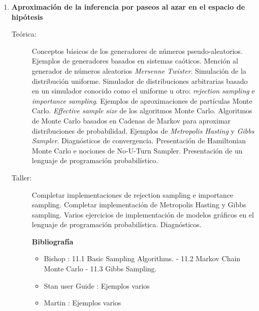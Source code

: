 \documentclass[10pt]{article}
\begin{document}
\begin{enumerate}
\item \textbf{Aproximación de la inferencia por paseos al azar en el espacio de hipótesis}
\vspace{-0.15cm}
\begin{description}
\item[Teórica:] Conceptos básicos de los generadores de números pseudo-aleatorios. Ejemplos de generadores basados en sistemas caóticos. Mención al generador de números aleatorios \emph{Mersenne Twister}. Simulación de la distribución uniforme. Simulador de distribuciones arbitrarias basado en un simulador conocido como el uniforme u otro: \emph{rejection sampling} e \emph{importance sampling}.
Ejemplos de aproximaciones de partículas Monte Carlo. \emph{Effective sample size} de los algoritmos Monte Carlo. Algoritmos de Monte Carlo basados en Cadenas de Markov para aproximar distribuciones de probabilidad. Ejemplos de \emph{Metropolis Hasting} y \emph{Gibbs Sampler}. Diagnósticos de convergencia.
Presentación de Hamiltonian Monte Carlo e nociones de No-U-Turn Sampler.
Presentación de un lenguaje de programación probabilístico.
\item[Taller:] Completar implementaciones de rejection sampling e importance sampling.
Completar implementación de Metropolis Hasting y Gibbs sampling.
Varios ejercicios de implementación de modelos gráficos en el lenguaje de programación probabilística.
Diagnósticos.
\item[] \textbf{Bibliografía}
\begin{itemize}
\item Bishop \cite{bishop2006-PRML}: 11.1 Basic Sampling Algorithms. - 11.2 Markov Chain Monte Carlo - 11.3 Gibbs Sampling.
\item Stan user Guide \cite{stan-userGuide}: Ejemplos varios
\item Martin \cite{martin2022-BMCP}: Ejemplos varios
\end{itemize}
\end{description}


\end{enumerate}
\end{document}

